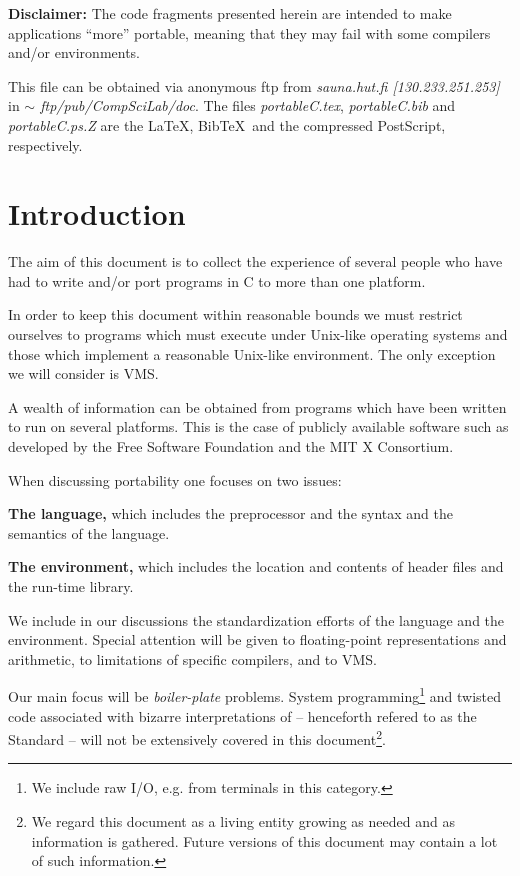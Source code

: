{\bf Disclaimer:} The code fragments presented herein
 are intended to make applications
``more'' portable, meaning that they may fail with some compilers
and/or environments.

This file can be obtained via anonymous ftp from {\em sauna.hut.fi
[130.233.251.253]} in {\em $\sim$ ftp/pub/CompSciLab/doc}. The files
{\em portableC.tex}, {\em portableC.bib} and {\em portableC.ps.Z}
are the \LaTeX, Bib\TeX\ and the compressed PostScript, respectively.

\section{Introduction}

The aim of this document is to collect the experience of several people
who have had to write and/or port programs in C to more than one platform.

In order to keep this document within reasonable bounds we must
restrict ourselves to programs which must execute under
Unix-like
operating systems and those which implement a reasonable Unix-like
environment. The only exception we will consider is
VMS.

A wealth of information can be obtained from programs which have been
written to run on several platforms. This is the case of
publicly available software such as
developed by the Free Software
Foundation and the MIT X Consortium.

When discussing portability one focuses on two issues:
\begin{description}

\item{\bf The language,} which includes the preprocessor and the syntax and the
 semantics of the language.

\item{\bf The environment,} which includes the location and contents of header
  files and the run-time library.

\end{description}

We include in our discussions the standardization efforts of
the language and the environment. Special attention will be given
to floating-point representations and arithmetic, to limitations
of specific compilers,  and to VMS.

Our main focus will be {\em boiler-plate} problems.
System programming\footnote{We include raw I/O, e.g. from terminals in
this category.}
and twisted code associated with bizarre interpretations of \cite{kn:ansi}
-- henceforth refered to as the Standard --
will not be extensively covered in this document\footnote{We regard
this document
as a living entity growing as needed and as information is gathered.
Future versions of this document may contain a lot of such information.}.


